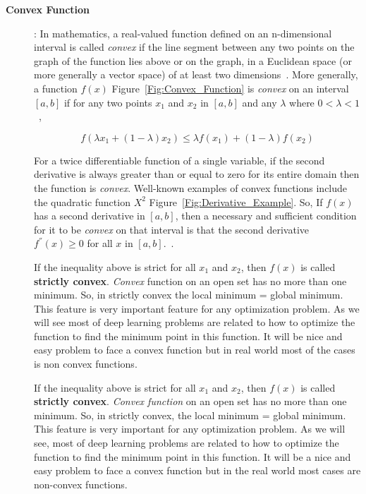 \begin{description}
 \item [\textbf{Convex Function}]: In mathematics, a real-valued function defined on an n-dimensional interval is called \textit{convex} if the line segment between any two points on the graph of the function lies above or on the graph, in a Euclidean space (or more generally a vector space) of at least two dimensions~\cite{Wiki_Convex_Function}. More generally, a function $f(x)$ Figure~\ref{Fig:Convex_Function} is \textit{convex} on an interval $[a,b]$ if for any two points $x_1$ and $x_2$ in $[a,b]$ and any $\lambda$ where $0<\lambda<1$~\cite{Rudin_1976},

\begin{equation}\label{eq:convex_fun}
 f(\lambda x_1 + (1-\lambda)x_2) \leq \lambda f(x_1) + (1 - \lambda) f(x_2)
\end{equation}

For a twice differentiable function of a single variable, if the second derivative is always greater than or equal to zero for its entire domain then the function is \textit{convex}. Well-known examples of convex functions include the quadratic function $X^2$ Figure~\ref{Fig:Derivative_Example}. So, If $f(x)$ has a second derivative in $[a,b]$, then a necessary and sufficient condition for it to be \textit{convex} on that interval is %
that the second derivative $f^{''}(x) \geq 0$ for all $x$ in $[a,b]$.~\cite{Wolfram_Convex}.

If the inequality above is strict for all $x_1$ and $x_2$, then $f(x)$ is called \textbf{strictly convex}. \textit{Convex} function on an open set has no more than one minimum. So, in strictly convex the local minimum = global minimum. This feature is very important feature for any optimization problem. As we will see most of deep learning problems are related to how to optimize the function to find the minimum point in this function. It will be nice and easy problem to face a convex function but in real world most of the cases is non convex functions.

If the inequality above is strict for all $x_1$ and $x_2$, then $f(x)$ is called \textbf{strictly convex}. \textit{Convex function} on an open set has no more than one minimum. So, in strictly convex, the local minimum = global minimum. This feature is very important for any optimization problem. As we will see, most of deep learning problems are related to how to optimize the function to find the minimum point in this function. It will be a nice and easy problem to face a convex function but in the real world most cases are non-convex functions.


\end{description}
